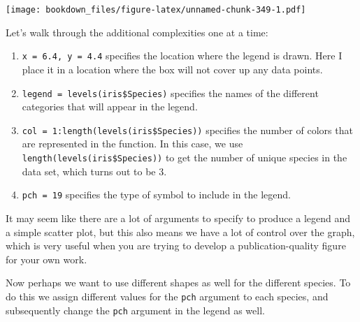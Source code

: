 \documentclass[]{krantz}
\makeatletter
\newenvironment{Shaded}{\begin{snugshade}}{\end{snugshade}}
\newcommand{\KeywordTok}[1]{\textcolor[rgb]{0.27,0.27,0.27}{\textbf{#1}}}
\newcommand{\DataTypeTok}[1]{\textcolor[rgb]{0.27,0.27,0.27}{#1}}
\newcommand{\DecValTok}[1]{\textcolor[rgb]{0.06,0.06,0.06}{#1}}
\newcommand{\FloatTok}[1]{\textcolor[rgb]{0.06,0.06,0.06}{#1}}
\newcommand{\StringTok}[1]{\textcolor[rgb]{0.5,0.5,0.5}{#1}}
\newcommand{\OperatorTok}[1]{\textcolor[rgb]{0.43,0.43,0.43}{\textbf{#1}}}
\newcommand{\NormalTok}[1]{#1}
\providecommand{\tightlist}{%
  \setlength{\itemsep}{0pt}\setlength{\parskip}{0pt}}
\newenvironment{kframe}{%
\medskip{}
\setlength{\fboxsep}{.8em}
 \def\at@end@of@kframe{}%
 \ifinner\ifhmode%
  \def\at@end@of@kframe{\end{minipage}}%
  \begin{minipage}{\columnwidth}%
 \fi\fi%
 \def\FrameCommand##1{\hskip\@totalleftmargin \hskip-\fboxsep
 \colorbox{shadecolor}{##1}\hskip-\fboxsep
     \hskip-\linewidth \hskip-\@totalleftmargin \hskip\columnwidth}%
 \MakeFramed {\advance\hsize-\width
   \@totalleftmargin\z@ \linewidth\hsize
   \@setminipage}}%
 {\par\unskip\endMakeFramed%
 \at@end@of@kframe}
\renewenvironment{Shaded}{\begin{kframe}}{\end{kframe}}
\makeatother
\begin{document}
\texttt{[image: bookdown\_files/figure-latex/unnamed-chunk-349-1.pdf]}

Let's walk through the additional complexities one at a time:

\begin{enumerate}
\def\labelenumi{\arabic{enumi}.}
\tightlist
\item
  \texttt{x\ =\ 6.4,\ y\ =\ 4.4} specifies the location where the legend
  is drawn. Here I place it in a location where the box will not cover
  up any data points.
\item
  \texttt{legend\ =\ levels(iris\$Species)} specifies the names of the
  different categories that will appear in the legend.
\item
  \texttt{col\ =\ 1:length(levels(iris\$Species))} specifies the number
  of colors that are represented in the function. In this case, we use
  \texttt{length(levels(iris\$Species))} to get the number of unique
  species in the data set, which turns out to be 3.
\item
  \texttt{pch\ =\ 19} specifies the type of symbol to include in the
  legend.
\end{enumerate}

It may seem like there are a lot of arguments to specify to produce a
legend and a simple scatter plot, but this also means we have a lot of
control over the graph, which is very useful when you are trying to
develop a publication-quality figure for your own work.

Now perhaps we want to use different shapes as well for the different
species. To do this we assign different values for the \texttt{pch}
argument to each species, and subsequently change the \texttt{pch}
argument in the legend as well.

\begin{Shaded}
\end{Shaded}
\end{document}

